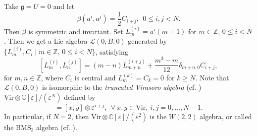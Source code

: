 \documentclass[12pt]{article}
\numberwithin{equation}{section}
\theoremstyle{definition}
\theoremstyle{plain}
\newcommand{\bC}{\ensuremath{\mathbb{C}}}
\newcommand{\bZ}{\ensuremath{\mathbb{Z}}}
\newcommand{\fg}{\mathfrak{g}}
\newcommand{\cL}{\ensuremath{\mathcal{L}}}
\begin{document}
Take $\fg=U=0$ and let 
\begin{equation}\label{trun.2}
    \beta(a^i,a^j)=\frac{1}{2}C_{i+j},\ \ 0\le i,j<N.
\end{equation}
Then $\beta$ is symmetric and invariant. Set $L_m^{(i)}=a^i(m+1)$ for $m\in\bZ$, $0\le i<N$. Then we get a Lie algebra $\cL(0,B,0)$ generated by $\{L_m^{(i)},C_i\mid m\in\bZ,\,0\le i<N\}$, satisfying 
\begin{equation}\label{W(2,2)}
    [L_m^{(i)},L_n^{(j)}]=(m-n)L_{m+n}^{(i+j)}+\frac{m^3-m}{12}\delta_{m+n,0}C_{i+j},
\end{equation}
for $m,n\in\bZ$, where $C_i$ is central and $L_m^{(k)}=C_k=0$ for $k\ge N$. Note that $\cL(0,B,0)$ is isomorphic to the \emph{truncated Virasoro algebra} (cf. \cite{JZ,Wilson}) $\mathrm{Vir}\otimes\bC[\varepsilon]/(\varepsilon^N)$ defined by 
\begin{equation*}
    [x\otimes \varepsilon^i,y\otimes \varepsilon^j]=[x,y]\otimes \varepsilon^{i+j},\ \ \forall\ x,y\in\mathrm{Vir},\ i,j=0,\dots,N-1.
\end{equation*}
In particular, if $N=2$, then $\mathrm{Vir}\otimes\bC[\varepsilon]/(\varepsilon^2)$ is the $W(2,2)$ algebra, or called the $\mathrm{BMS}_3$ algebra (cf. \cite{O,ZD}).
\end{document}

